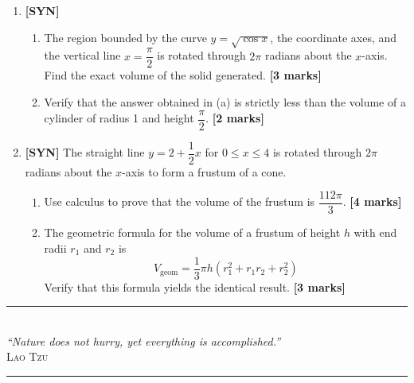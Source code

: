 \documentclass[11pt,a4paper]{article}
\begin{document}
\begin{enumerate}[resume]
\item \textbf{[SYN]} 
\begin{enumerate}[label=(\alph*)]
  \item The region bounded by the curve $y = \sqrt{\cos x}$, the coordinate axes, and the vertical line $x = \dfrac{\pi}{2}$ is rotated through $2\pi$ radians about the $x$-axis. Find the exact volume of the solid generated. \hfill{\textbf{[3 marks]}}
  \item Verify that the answer obtained in (a) is strictly less than the volume of a cylinder of radius 1 and height $\dfrac{\pi}{2}$. \hfill{\textbf{[2 marks]}}
\end{enumerate}

\item \textbf{[SYN]} The straight line $y = 2 + \dfrac{1}{2}x$ for $0 \le x \le 4$ is rotated through $2\pi$ radians about the $x$-axis to form a frustum of a cone.
\begin{enumerate}[label=(\alph*)]
  \item Use calculus to prove that the volume of the frustum is $\dfrac{112\pi}{3}$. \hfill{\textbf{[4 marks]}}
  \item The geometric formula for the volume of a frustum of height $h$ with end radii $r_1$ and $r_2$ is
  \[
  V_{\text{geom}} = \frac{1}{3}\pi h(r_1^2 + r_1 r_2 + r_2^2)
  \]
  Verify that this formula yields the identical result. \hfill{\textbf{[3 marks]}}
\end{enumerate}

\end{enumerate}

\vspace{14pt}
\begin{center}
  {\color{accentline}\rule{0.4\textwidth}{0.4pt}}\\[5pt]
  {\footnotesize\itshape\color{medgray} ``Nature does not hurry, yet everything is accomplished.''}\\[2pt]
  {\scriptsize\scshape\color{medgray} Lao Tzu}\\[5pt]
  {\color{accentline}\rule{0.4\textwidth}{0.4pt}}
\end{center}
\end{document}
